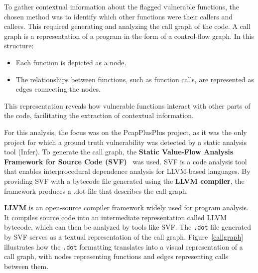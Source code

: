 To gather contextual information about the flagged vulnerable functions, the chosen method was to identify which other functions were their callers and callees. This required generating and analyzing the call graph of the code. A call graph is a representation of a program in the form of a control-flow graph. In this structure:
\begin{itemize}
    \item Each function is depicted as a node.
    \item The relationships between functions, such as function calls, are represented as edges connecting the nodes.
\end{itemize}

This representation reveals how vulnerable functions interact with other parts of the code, facilitating the extraction of contextual information.

For this analysis, the focus was on the PcapPlusPlus project, as it was the only project for which a ground truth vulnerability was detected by a static analysis tool (Infer). To generate the call graph, the \textbf{Static Value-Flow Analysis Framework for Source Code (SVF)}~\cite{svf} was used. SVF is a code analysis tool that enables interprocedural dependence analysis for LLVM-based languages. By providing SVF with a bytecode file generated using the \textbf{LLVM compiler}, the framework produces a .dot file that describes the call graph.

\textbf{LLVM} is an open-source compiler framework widely used for program analysis. It compiles source code into an intermediate representation called LLVM bytecode, which can then be analyzed by tools like SVF. The \texttt{.dot} file generated by SVF serves as a textual representation of the call graph. Figure~\ref{callgraph} illustrates how the \texttt{.dot} formatting translates into a visual representation of a call graph, with nodes representing functions and edges representing calls between them.

